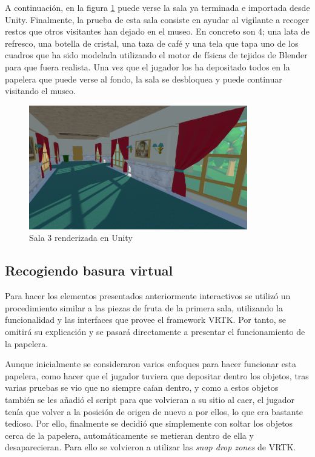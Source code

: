 A continuación, en la figura \ref{fig:unity-sala-3} puede verse la sala ya terminada e importada desde Unity. Finalmente, la prueba de esta sala consiste en ayudar al vigilante a recoger restos que otros visitantes han dejado en el museo. En concreto son 4; una lata de refresco, una botella de cristal, una taza de café y una tela que tapa uno de los cuadros que ha sido modelada utilizando el motor de físicas de tejidos de Blender para que fuera realista. Una vez que el jugador los ha depositado todos en la papelera que puede verse al fondo, la sala se desbloquea y puede continuar visitando el museo.

\begin{figure}[!h]
\begin{center}
\includegraphics[width=0.85\textwidth]{imagenes/7/salas-unity/unity-sala-3.png}
\caption{Sala 3 renderizada en Unity}
\label{fig:unity-sala-3}
\end{center}
\end{figure}


\subsection{Recogiendo basura virtual}

Para hacer los elementos presentados anteriormente interactivos se utilizó un procedimiento similar a las piezas de fruta de la primera sala, utilizando la funcionalidad y las interfaces que provee el framework \acs{VRTK}. Por tanto, se omitirá su explicación y se pasará directamente a presentar el funcionamiento de la papelera.

Aunque inicialmente se consideraron varios enfoques para hacer funcionar esta papelera, como hacer que el jugador tuviera que depositar dentro los objetos, tras varias pruebas se vio que no siempre caían dentro, y como a estos objetos también se les añadió el script para que volvieran a su sitio al caer, el jugador tenía que volver a la posición de origen de nuevo a por ellos, lo que era bastante tedioso. Por ello, finalmente se decidió que simplemente con soltar los objetos cerca de la papelera, automáticamente se metieran dentro de ella y desaparecieran. Para ello se volvieron a utilizar las \textit{snap drop zones} de \acs{VRTK}. 

